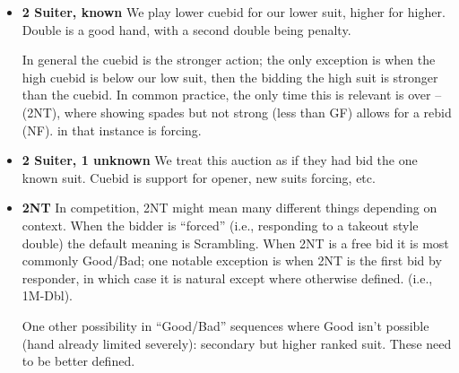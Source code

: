\documentclass[tom-ari]{subfile}
\begin{document}
\begin{itemize}[]
\item \textbf{2 Suiter, known} We play lower cuebid for our lower suit, higher for higher. Double is a good hand, with a second double being penalty.

In general the cuebid is the stronger action; the only exception is when the high cuebid is below our low suit, then the bidding the high suit is stronger than the cuebid.  In common practice, the only time this is relevant is over --(2NT), where  showing spades but not strong (less than GF) allows for a  rebid (NF).  in that instance is forcing.	

\item \textbf{2 Suiter, 1 unknown} We treat this auction as if they had bid the one known suit. Cuebid is support for opener, new suits forcing, etc.

\item \textbf{2NT} In competition, 2NT might mean many different things depending on context. When the bidder is ``forced'' (i.e., responding to a takeout style double) the default meaning is Scrambling. When 2NT is a free bid it is most commonly Good/Bad; one notable exception is when 2NT is the first bid by responder, in which case it is natural except where otherwise defined. (i.e., 1M-Dbl).

One other possibility in ``Good/Bad'' sequences where Good isn't possible (hand already limited severely): secondary but higher ranked suit. These need to be better defined. 
\end{itemize}
\end{document}
